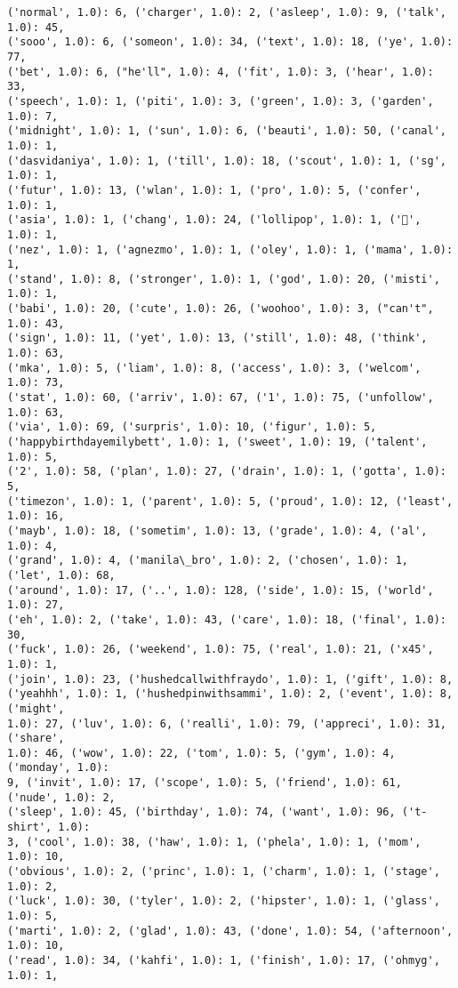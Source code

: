 \documentclass[11pt]{article}
\begin{document}
\begin{Verbatim}[commandchars=\\\{\}]
('normal', 1.0): 6, ('charger', 1.0): 2, ('asleep', 1.0): 9, ('talk', 1.0): 45,
('sooo', 1.0): 6, ('someon', 1.0): 34, ('text', 1.0): 18, ('ye', 1.0): 77,
('bet', 1.0): 6, ("he'll", 1.0): 4, ('fit', 1.0): 3, ('hear', 1.0): 33,
('speech', 1.0): 1, ('piti', 1.0): 3, ('green', 1.0): 3, ('garden', 1.0): 7,
('midnight', 1.0): 1, ('sun', 1.0): 6, ('beauti', 1.0): 50, ('canal', 1.0): 1,
('dasvidaniya', 1.0): 1, ('till', 1.0): 18, ('scout', 1.0): 1, ('sg', 1.0): 1,
('futur', 1.0): 13, ('wlan', 1.0): 1, ('pro', 1.0): 5, ('confer', 1.0): 1,
('asia', 1.0): 1, ('chang', 1.0): 24, ('lollipop', 1.0): 1, ('🍭', 1.0): 1,
('nez', 1.0): 1, ('agnezmo', 1.0): 1, ('oley', 1.0): 1, ('mama', 1.0): 1,
('stand', 1.0): 8, ('stronger', 1.0): 1, ('god', 1.0): 20, ('misti', 1.0): 1,
('babi', 1.0): 20, ('cute', 1.0): 26, ('woohoo', 1.0): 3, ("can't", 1.0): 43,
('sign', 1.0): 11, ('yet', 1.0): 13, ('still', 1.0): 48, ('think', 1.0): 63,
('mka', 1.0): 5, ('liam', 1.0): 8, ('access', 1.0): 3, ('welcom', 1.0): 73,
('stat', 1.0): 60, ('arriv', 1.0): 67, ('1', 1.0): 75, ('unfollow', 1.0): 63,
('via', 1.0): 69, ('surpris', 1.0): 10, ('figur', 1.0): 5,
('happybirthdayemilybett', 1.0): 1, ('sweet', 1.0): 19, ('talent', 1.0): 5,
('2', 1.0): 58, ('plan', 1.0): 27, ('drain', 1.0): 1, ('gotta', 1.0): 5,
('timezon', 1.0): 1, ('parent', 1.0): 5, ('proud', 1.0): 12, ('least', 1.0): 16,
('mayb', 1.0): 18, ('sometim', 1.0): 13, ('grade', 1.0): 4, ('al', 1.0): 4,
('grand', 1.0): 4, ('manila\_bro', 1.0): 2, ('chosen', 1.0): 1, ('let', 1.0): 68,
('around', 1.0): 17, ('..', 1.0): 128, ('side', 1.0): 15, ('world', 1.0): 27,
('eh', 1.0): 2, ('take', 1.0): 43, ('care', 1.0): 18, ('final', 1.0): 30,
('fuck', 1.0): 26, ('weekend', 1.0): 75, ('real', 1.0): 21, ('x45', 1.0): 1,
('join', 1.0): 23, ('hushedcallwithfraydo', 1.0): 1, ('gift', 1.0): 8,
('yeahhh', 1.0): 1, ('hushedpinwithsammi', 1.0): 2, ('event', 1.0): 8, ('might',
1.0): 27, ('luv', 1.0): 6, ('realli', 1.0): 79, ('appreci', 1.0): 31, ('share',
1.0): 46, ('wow', 1.0): 22, ('tom', 1.0): 5, ('gym', 1.0): 4, ('monday', 1.0):
9, ('invit', 1.0): 17, ('scope', 1.0): 5, ('friend', 1.0): 61, ('nude', 1.0): 2,
('sleep', 1.0): 45, ('birthday', 1.0): 74, ('want', 1.0): 96, ('t-shirt', 1.0):
3, ('cool', 1.0): 38, ('haw', 1.0): 1, ('phela', 1.0): 1, ('mom', 1.0): 10,
('obvious', 1.0): 2, ('princ', 1.0): 1, ('charm', 1.0): 1, ('stage', 1.0): 2,
('luck', 1.0): 30, ('tyler', 1.0): 2, ('hipster', 1.0): 1, ('glass', 1.0): 5,
('marti', 1.0): 2, ('glad', 1.0): 43, ('done', 1.0): 54, ('afternoon', 1.0): 10,
('read', 1.0): 34, ('kahfi', 1.0): 1, ('finish', 1.0): 17, ('ohmyg', 1.0): 1,

\end{Verbatim}
\end{document}
